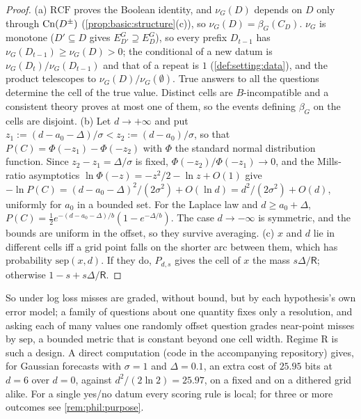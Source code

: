 \begin{proof}
(a) $\mathrm{RCF}$ proves the Boolean identity, and $\nu_G(D)$ depends on $D$ only through $\mathrm{Cn}(D^\pm)$ (\cref{prop:basic:structure}(c)), so $\nu_G(D)=\beta_G(C_D)$. $\nu_G$ is monotone ($D'\subseteq D$ gives $E^G_{D'}\supseteq E^G_D$), so every prefix $D_{t-1}$ has $\nu_G(D_{t-1})\ge\nu_G(D)>0$; the conditional of a new datum is $\nu_G(D_t)/\nu_G(D_{t-1})$ and that of a repeat is $1$ (\cref{def:setting:data}), and the product telescopes to $\nu_G(D)/\nu_G(\emptyset)$. True answers to all the questions determine the cell of the true value. Distinct cells are $B$-incompatible and a consistent theory proves at most one of them, so the events defining $\beta_G$ on the cells are disjoint. (b) Let $d\to+\infty$ and put $z_1:=(d-a_0-\Delta)/\sigma<z_2:=(d-a_0)/\sigma$, so that $P(C)=\Phi(-z_1)-\Phi(-z_2)$ with $\Phi$ the standard normal distribution function. Since $z_2-z_1=\Delta/\sigma$ is fixed, $\Phi(-z_2)/\Phi(-z_1)\to0$, and the Mills-ratio asymptotics $\ln\Phi(-z)=-z^2/2-\ln z+O(1)$ give $-\ln P(C)=(d-a_0-\Delta)^2/(2\sigma^2)+O(\ln d)=d^2/(2\sigma^2)+O(d)$, uniformly for $a_0$ in a bounded set. For the Laplace law and $d\ge a_0+\Delta$, $P(C)=\frac12e^{-(d-a_0-\Delta)/b}(1-e^{-\Delta/b})$. The case $d\to-\infty$ is symmetric, and the bounds are uniform in the offset, so they survive averaging. (c) $x$ and $d$ lie in different cells iff a grid point falls on the shorter arc between them, which has probability $\mathrm{sep}(x,d)$. If they do, $P_{d,s}$ gives the cell of $x$ the mass $s\Delta/\mathsf R$; otherwise $1-s+s\Delta/\mathsf R$.
\end{proof}

So under log loss misses are graded, without bound, but by each hypothesis's own error model; a family of questions about one quantity fixes only a resolution, and asking each of many values one randomly offset question grades near-point misses by $\mathrm{sep}$, a bounded metric that is constant beyond one cell width. Regime R is such a design. A direct computation (code in the accompanying repository) gives, for Gaussian forecasts with $\sigma=1$ and $\Delta=0.1$, an extra cost of $25.95$ bits at $d=6$ over $d=0$, against $d^2/(2\ln2)=25.97$, on a fixed and on a dithered grid alike. For a single yes/no datum every scoring rule is local; for three or more outcomes see \cref{rem:phil:purpose}.

